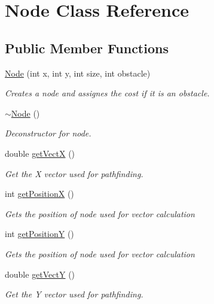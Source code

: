 \hypertarget{class_node}{}\section{Node Class Reference}
\label{class_node}
\subsection*{Public Member Functions}
\begin{DoxyCompactItemize}
\item 
\mbox{\hyperlink{class_node_a058fbf447dab1b0748fb203b37a0798e}{Node}} (int x, int y, int size, int obstacle)
\begin{DoxyCompactList}\small\item\em Creates a node and assignes the cost if it is an obstacle. \end{DoxyCompactList}\item 
\mbox{\hyperlink{class_node_aa0840c3cb5c7159be6d992adecd2097c}{$\sim$\+Node}} ()
\begin{DoxyCompactList}\small\item\em Deconstructor for node. \end{DoxyCompactList}\item 
double \mbox{\hyperlink{class_node_ab680abb24e66f0ac44ad1c01100c284d}{get\+VectX}} ()
\begin{DoxyCompactList}\small\item\em Get the X vector used for pathfinding. \end{DoxyCompactList}\item 
int \mbox{\hyperlink{class_node_a535896357ea40bc56fe4d6aed70b6361}{get\+PositionX}} ()
\begin{DoxyCompactList}\small\item\em Gets the position of node used for vector calculation \end{DoxyCompactList}\item 
int \mbox{\hyperlink{class_node_a9a5a7aa1c1cade5e1c959115d8f56441}{get\+PositionY}} ()
\begin{DoxyCompactList}\small\item\em Gets the position of node used for vector calculation \end{DoxyCompactList}\item 
double \mbox{\hyperlink{class_node_a94cc29a521ebaf4de2a8d71b7e55346e}{get\+VectY}} ()
\begin{DoxyCompactList}\small\item\em Get the Y vector used for pathfinding. \end{DoxyCompactList}\item 

\end{DoxyCompactItemize}
